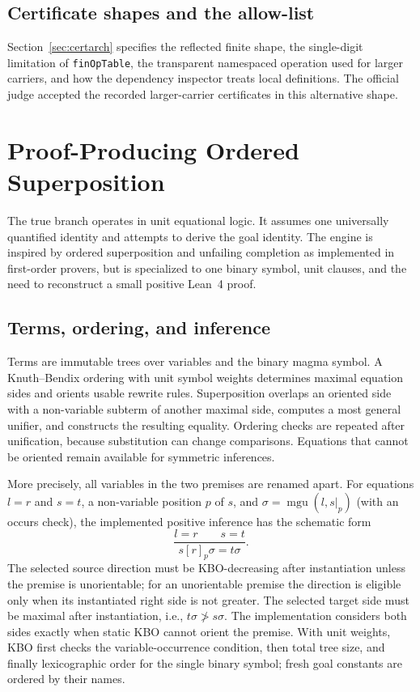 \documentclass[10pt,twocolumn]{article}
\newcommand{\lean}{Lean~4\xspace}
\newcommand{\code}[1]{\texttt{#1}}
\begin{document}
\subsection{Certificate shapes and the allow-list}
\label{sec:allowlist}

Section~\ref{sec:certarch} specifies the reflected finite shape, the
single-digit limitation of \code{finOpTable}, the transparent namespaced
operation used for larger carriers, and how the dependency inspector treats
local definitions.  The official judge accepted the recorded larger-carrier
certificates in this alternative shape.

\section{Proof-Producing Ordered Superposition}
\label{sec:true}

The true branch operates in unit equational logic.  It assumes one universally
quantified identity and attempts to derive the goal identity.  The engine is
inspired by ordered superposition and unfailing completion as implemented in
first-order provers, but is specialized to one binary symbol, unit clauses,
and the need to reconstruct a small positive \lean proof.

\subsection{Terms, ordering, and inference}

Terms are immutable trees over variables and the binary magma symbol.  A
Knuth--Bendix ordering with unit symbol weights determines maximal equation
sides and orients usable rewrite rules.  Superposition overlaps an oriented
side with a non-variable subterm of another maximal side, computes a most
general unifier, and constructs the resulting equality.  Ordering checks are
repeated after unification, because substitution can change comparisons.
Equations that cannot be oriented remain available for symmetric inferences.

More precisely, all variables in the two premises are renamed apart.  For
equations $l=r$ and $s=t$, a non-variable position $p$ of $s$, and
$\sigma=\mathop{\mathrm{mgu}}(l,s|_p)$ (with an occurs check), the implemented
positive inference has the schematic form
\[
\frac{l=r \qquad s=t}
     {s[r]_p\sigma=t\sigma}.
\tag{SP}
\]
The selected source direction must be KBO-decreasing after instantiation unless
the premise is unorientable; for an unorientable premise the direction is
eligible only when its instantiated right side is not greater.  The selected
target side must be maximal after instantiation, i.e., $t\sigma\not> s\sigma$.
The implementation considers both sides exactly when static KBO cannot orient
the premise.  With unit weights, KBO first checks the variable-occurrence
condition, then total tree size, and finally lexicographic order for the single
binary symbol; fresh goal constants are ordered by their names.
\end{document}
